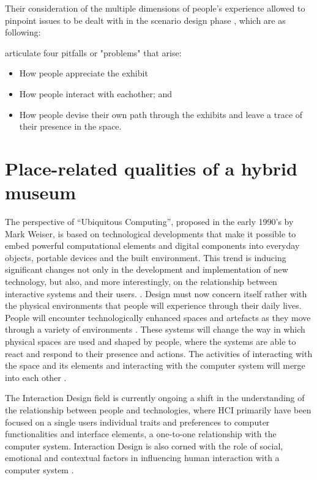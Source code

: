 \break
Their consideration of the multiple dimensions of people's experience allowed to pinpoint issues to be dealt with in the scenario design phase \autocite[p. 178]{hybridplace_ciolfi}, which are as following:

\autocite[p. 168]{hybridplace_ciolfi} articulate four pitfalls or "problems" that arise: 
\begin{itemize}
    \item How people appreciate the exhibit
    \item How people interact with eachother; and
    \item How people devise their own path through the exhibits and leave a trace of their presence in the space.
\end{itemize}




\section{Place-related qualities of a hybrid museum}

The perspective of “Ubiquitous Computing”, proposed in the early 1990’s by Mark Weiser, is based on technological developments that make it possible to embed powerful computational elements and digital components into everyday objects, portable devices and the built environment. This trend is inducing significant changes not only in the development and implementation of new technology, but also, and more interestingly, on the relationship between interactive systems and their users. \autocite[p. 217]{ciolfi_space_2005}. Design must now concern itself rather with the physical environments that people will experience through their daily lives. People will encounter technologically enhanced spaces and artefacts as they move through a variety of environments \autocite[p. 217]{ciolfi_space_2005}. These systems will change the way in which physical spaces are used and shaped by people, where the systems are able to react and respond to their presence and actions. The activities of interacting with the space and its elements and interacting with the computer system will merge into each other \autocite[p. 217]{ciolfi_space_2005}. 

The Interaction Design field is currently ongoing a shift in the understanding of the relationship between people and technologies, where HCI primarily have been focused on a single users individual traits and preferences to computer functionalities and interface elements, a one-to-one relationship with the computer system. Interaction Design is also corned with the role of social, emotional and contextual factors in influencing human interaction with a computer system \autocite[p. 217]{ciolfi_space_2005}.

